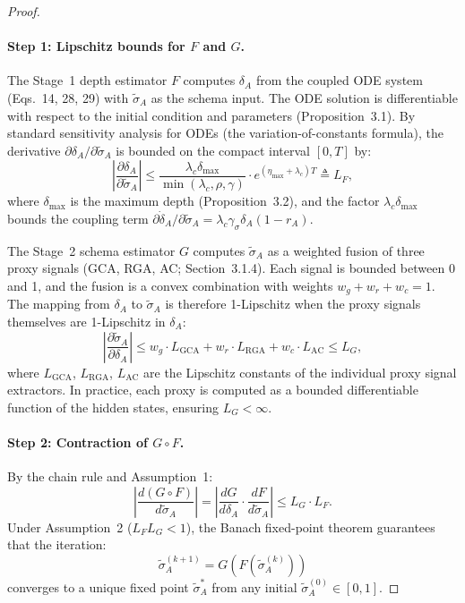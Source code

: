 \begin{proof}

\paragraph{Step 1: Lipschitz bounds for $F$ and $G$.}
The Stage~1 depth estimator $F$ computes $\delta_A$ from the coupled
ODE system (Eqs.~14, 28, 29) with $\tilde{\sigma}_A$ as the schema
input. The ODE solution is differentiable with respect to the initial
condition and parameters (Proposition~3.1). By standard sensitivity
analysis for ODEs (the variation-of-constants formula), the derivative
$\partial \delta_A / \partial \tilde{\sigma}_A$ is bounded on the
compact interval $[0, T]$ by:
\[
\left|\frac{\partial \delta_A}{\partial \tilde{\sigma}_A}\right|
\leq \frac{\lambda_c \delta_{\max}}{\min(\lambda_c, \rho, \gamma)}
\cdot e^{(\eta_{\max} + \lambda_c) T} \triangleq L_F,
\]
where $\delta_{\max}$ is the maximum depth (Proposition~3.2), and the
factor $\lambda_c \delta_{\max}$ bounds the coupling term
$\partial \dot{\delta}_A / \partial \tilde{\sigma}_A = \lambda_c \gamma_\sigma \delta_A (1 - r_A)$.

The Stage~2 schema estimator $G$ computes $\tilde{\sigma}_A$ as a
weighted fusion of three proxy signals (GCA, RGA, AC; Section~3.1.4).
Each signal is bounded between 0 and 1, and the fusion is a convex
combination with weights $w_g + w_r + w_c = 1$. The mapping from
$\delta_A$ to $\tilde{\sigma}_A$ is therefore 1-Lipschitz when the
proxy signals themselves are 1-Lipschitz in $\delta_A$:
\[
\left|\frac{\partial \tilde{\sigma}_A}{\partial \delta_A}\right|
\leq w_g \cdot L_{\text{GCA}} + w_r \cdot L_{\text{RGA}} + w_c \cdot L_{\text{AC}}
\leq L_G,
\]
where $L_{\text{GCA}}$, $L_{\text{RGA}}$, $L_{\text{AC}}$ are the
Lipschitz constants of the individual proxy signal extractors.
In practice, each proxy is computed as a bounded differentiable
function of the hidden states, ensuring $L_G < \infty$.

\paragraph{Step 2: Contraction of $G \circ F$.}
By the chain rule and Assumption~1:
\[
\left|\frac{d(G \circ F)}{d\tilde{\sigma}_A}\right|
= \left|\frac{dG}{d\delta_A} \cdot \frac{dF}{d\tilde{\sigma}_A}\right|
\leq L_G \cdot L_F.
\]
Under Assumption~2 ($L_F L_G < 1$), the Banach fixed-point theorem
guarantees that the iteration:
\[
\tilde{\sigma}_A^{(k+1)} = G(F(\tilde{\sigma}_A^{(k)}))
\]
converges to a unique fixed point $\tilde{\sigma}_A^*$ from any
initial $\tilde{\sigma}_A^{(0)} \in [0, 1]$.


\end{proof}
